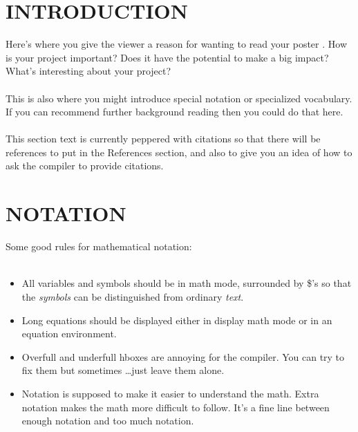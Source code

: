 \documentclass[landscape]{sciposter}
\begin{document}
\begin{multicols}{4}

\section*{INTRODUCTION}

Here's where you give the viewer a reason for wanting to read your poster  \cite{CD}.  How is your project important?  Does it have the potential to make a big impact? What's interesting about your project? 
\\
\\
This is also where you might introduce special notation or specialized vocabulary.  If you can recommend further background reading \cite{Huppert} then you could do that here.  
\\
\\
This section text is currently peppered with citations so that there will be references to put in the References section, and also to give you an idea of how to ask the compiler to provide citations.


\section{NOTATION}

Some good rules for mathematical notation:
\\
\\
\begin{itemize}
\item All variables and symbols should be in math mode, surrounded by \$'s so that the {\it symbols} can be distinguished from ordinary {\it text}.
\item Long equations should be displayed either in display math mode or in an equation environment.
\item Overfull and underfull hboxes are annoying for the compiler.  You can try to fix them but sometimes \dots just leave them alone.
\item Notation is supposed to make it easier to understand the math.  Extra notation makes the math more difficult to follow.  It's a fine line between enough notation and too much notation.
\end{itemize}


\end{multicols}
\end{document}
